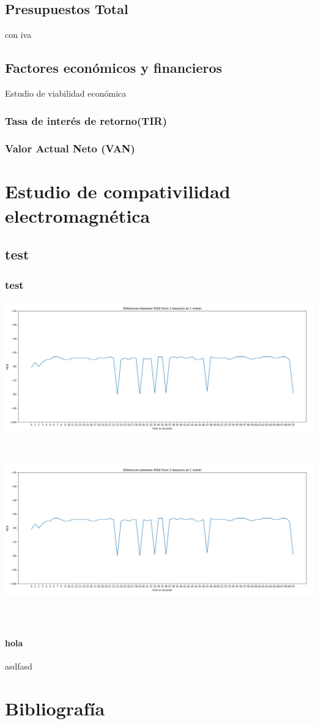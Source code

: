 \documentclass[a4paper ,12pt, onecolumn]{article}
\begin{document}
    \subsection{Presupuestos Total}
        con iva
    \subsection{Factores económicos y financieros}
    Estudio de viabilidad económica
        \subsubsection{Tasa de interés de retorno(TIR)}
        \subsubsection{Valor Actual Neto (VAN)}

\section{Estudio de compativilidad electromagnética}
\subsection{test}
\subsubsection{test}

\includegraphics[scale=0.3]{5min_beacon_rssi}
\includegraphics[width=15cm, height=8cm]{5min_beacon_rssi}
\paragraph{hola}
asdfasd

\section{Bibliografía}
\end{document}
